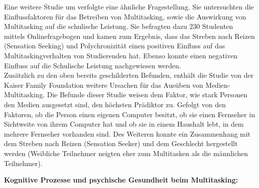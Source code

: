 Eine weitere Studie um  verfolgte eine ähnliche Fragestellung. Sie untersuchten die Einflussfaktoren für das Betreiben von Multitasking, sowie die Auswirkung von Multitasking auf die schulische Leistung. Sie befragten dazu 230 Studenten mittels Onlinefragebogen und kamen zum Ergebnis, dass das Streben nach Reizen (Sensation Seeking) und Polychronizität einen positiven Einfluss auf das Multitaskingverhalten von Studierenden hat. Ebenso konnte einen negativen Einfluss auf die Schulische Leistung nachgewiesen werden.\\
Zusätzlich zu den oben bereits geschilderten Befunden, enthält die Studie von  der Kaiser Family Foundation weitere Ursachen für das Ausüben von Medien-Multitasking. Die Befunde dieser Studie weisen dem Faktor, wie stark Personen den Medien ausgesetzt sind, den höchsten Prädiktor zu. Gefolgt von den Faktoren, ob die Person einen eigenen Computer besitzt, ob sie einen Fernseher in Sichtweite von ihrem Computer hat und ob sie in einem Haushalt lebt, in dem mehrere Fernseher vorhanden sind. Des Weiteren konnte ein Zusammenhang mit dem Streben nach Reizen (Sensation Seeker) und dem Geschlecht hergestellt werden (Weibliche Teilnehmer neigten eher zum Multitasken als die männlichen Teilnehmer).
\par
\textbf{Kognitive Prozesse und psychische Gesundheit beim Multitasking:} 
